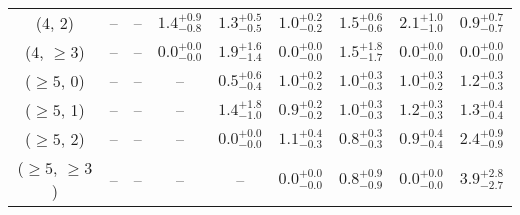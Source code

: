\begin{table}[h!]
{\begin{tabular}{ccccccccc}
	(4, 2) & -- & -- & $1.4^{+ 0.9 }_{- 0.8 }$ & $1.3^{+ 0.5 }_{- 0.5 }$ & $1.0^{+ 0.2 }_{- 0.2 }$ & $1.5^{+ 0.6 }_{- 0.6 }$ & $2.1^{+ 1.0 }_{- 1.0 }$ & $0.9^{+ 0.7 }_{- 0.7 }$ \\[0.5ex] 
	(4, $\ge3$) & -- & -- & $0.0^{+ 0.0 }_{- 0.0 }$ & $1.9^{+ 1.6 }_{- 1.4 }$ & $0.0^{+ 0.0 }_{- 0.0 }$ & $1.5^{+ 1.8 }_{- 1.7 }$ & $0.0^{+ 0.0 }_{- 0.0 }$ & $0.0^{+ 0.0 }_{- 0.0 }$ \\[0.5ex] 
	($\ge5$, 0) & -- & -- & -- & $0.5^{+ 0.6 }_{- 0.4 }$ & $1.0^{+ 0.2 }_{- 0.2 }$ & $1.0^{+ 0.3 }_{- 0.3 }$ & $1.0^{+ 0.3 }_{- 0.2 }$ & $1.2^{+ 0.3 }_{- 0.3 }$ \\[0.5ex] 
	($\ge5$, 1) & -- & -- & -- & $1.4^{+ 1.8 }_{- 1.0 }$ & $0.9^{+ 0.2 }_{- 0.2 }$ & $1.0^{+ 0.3 }_{- 0.3 }$ & $1.2^{+ 0.3 }_{- 0.3 }$ & $1.3^{+ 0.4 }_{- 0.4 }$ \\[0.5ex] 
	($\ge5$, 2) & -- & -- & -- & $0.0^{+ 0.0 }_{- 0.0 }$ & $1.1^{+ 0.4 }_{- 0.3 }$ & $0.8^{+ 0.3 }_{- 0.3 }$ & $0.9^{+ 0.4 }_{- 0.4 }$ & $2.4^{+ 0.9 }_{- 0.9 }$ \\[0.5ex] 
	($\ge5$, $\ge3$) & -- & -- & -- & -- & $0.0^{+ 0.0 }_{- 0.0 }$ & $0.8^{+ 0.9 }_{- 0.9 }$ & $0.0^{+ 0.0 }_{- 0.0 }$ & $3.9^{+ 2.8 }_{- 2.7 }$ \\[0.5ex] 
	\hline
	\hline
\end{tabular}}
\end{table}
